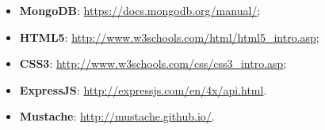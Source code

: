 \begin{itemize}
\item\textbf{ MongoDB}: \url{https://docs.mongodb.org/manual/};
\item \textbf{HTML5}: \url{http://www.w3schools.com/html/html5_intro.asp};
\item \textbf{CSS3}: \url{http://www.w3schools.com/css/css3_intro.asp};

\item \textbf{ExpressJS}: \url{http://expressjs.com/en/4x/api.html}.

\item \textbf{Mustache}: \url{http://mustache.github.io/}.
\end{itemize}

